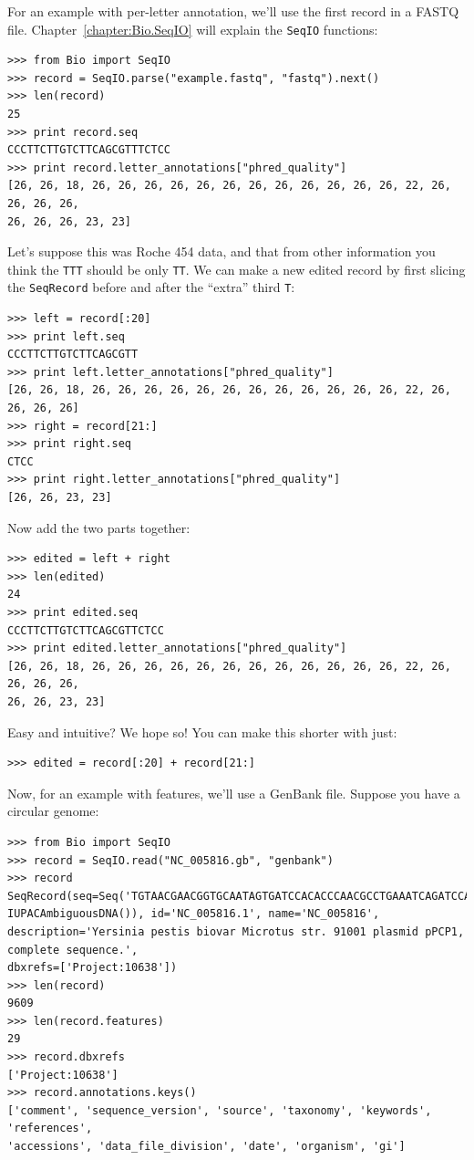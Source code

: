 \documentclass{report}
\begin{document}
For an example with per-letter annotation, we'll use the first record in a
FASTQ file. Chapter~\ref{chapter:Bio.SeqIO} will explain the \verb|SeqIO| functions:

\begin{verbatim}
>>> from Bio import SeqIO
>>> record = SeqIO.parse("example.fastq", "fastq").next()
>>> len(record)
25
>>> print record.seq
CCCTTCTTGTCTTCAGCGTTTCTCC
>>> print record.letter_annotations["phred_quality"]
[26, 26, 18, 26, 26, 26, 26, 26, 26, 26, 26, 26, 26, 26, 26, 22, 26, 26, 26, 26,
26, 26, 26, 23, 23]
\end{verbatim}

\noindent Let's suppose this was Roche 454 data, and that from other information
you think the \texttt{TTT} should be only \texttt{TT}. We can make a new edited
record by first slicing the \verb|SeqRecord| before and after the ``extra''
third \texttt{T}:

\begin{verbatim}
>>> left = record[:20]
>>> print left.seq
CCCTTCTTGTCTTCAGCGTT
>>> print left.letter_annotations["phred_quality"]
[26, 26, 18, 26, 26, 26, 26, 26, 26, 26, 26, 26, 26, 26, 26, 22, 26, 26, 26, 26]
>>> right = record[21:]
>>> print right.seq
CTCC
>>> print right.letter_annotations["phred_quality"]
[26, 26, 23, 23]
\end{verbatim}

\noindent Now add the two parts together:

\begin{verbatim}
>>> edited = left + right
>>> len(edited)
24
>>> print edited.seq
CCCTTCTTGTCTTCAGCGTTCTCC
>>> print edited.letter_annotations["phred_quality"]
[26, 26, 18, 26, 26, 26, 26, 26, 26, 26, 26, 26, 26, 26, 26, 22, 26, 26, 26, 26,
26, 26, 23, 23]
\end{verbatim}

\noindent Easy and intuitive? We hope so! You can make this shorter with just:

\begin{verbatim}
>>> edited = record[:20] + record[21:]
\end{verbatim}

Now, for an example with features, we'll use a GenBank file.
Suppose you have a circular genome:

\begin{verbatim}
>>> from Bio import SeqIO
>>> record = SeqIO.read("NC_005816.gb", "genbank")
>>> record
SeqRecord(seq=Seq('TGTAACGAACGGTGCAATAGTGATCCACACCCAACGCCTGAAATCAGATCCAGG...CTG',
IUPACAmbiguousDNA()), id='NC_005816.1', name='NC_005816',
description='Yersinia pestis biovar Microtus str. 91001 plasmid pPCP1, complete sequence.',
dbxrefs=['Project:10638'])
>>> len(record)
9609
>>> len(record.features)
29
>>> record.dbxrefs
['Project:10638']
>>> record.annotations.keys()
['comment', 'sequence_version', 'source', 'taxonomy', 'keywords', 'references',
'accessions', 'data_file_division', 'date', 'organism', 'gi']
\end{verbatim}
\end{document}
